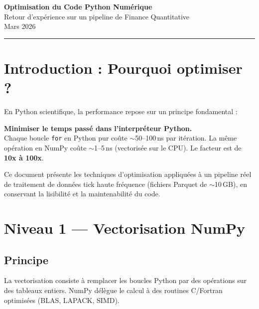 \documentclass[11pt, a4paper]{article}
\begin{document}
\begin{center}
    {\LARGE\bfseries Optimisation du Code Python Num\'erique}\\[0.4cm]
    {\large Retour d'exp\'erience sur un pipeline de Finance Quantitative}\\[0.8cm]
    {\normalsize Mars 2026}\\[0.3cm]
    \rule{\textwidth}{0.4pt}
\end{center}

\tableofcontents
\newpage

\section{Introduction : Pourquoi optimiser ?}

En Python scientifique, la performance repose sur un principe fondamental :

\begin{keybox}[R\`egle d'or]
\textbf{Minimiser le temps pass\'e dans l'interpr\'eteur Python.}\\[0.2cm]
Chaque boucle \texttt{for} en Python pur co\^ute $\sim$50--100\,ns par it\'eration.
La m\^eme op\'eration en NumPy co\^ute $\sim$1--5\,ns (vectoris\'ee sur le CPU).
Le facteur est de \textbf{10x \`a 100x}.
\end{keybox}

Ce document pr\'esente les techniques d'optimisation appliqu\'ees \`a un pipeline r\'eel
de traitement de donn\'ees tick haute fr\'equence (fichiers Parquet de $\sim$10\,GB),
en conservant la lisibilit\'e et la maintenabilit\'e du code.


\section{Niveau 1 --- Vectorisation NumPy}

\subsection{Principe}

La vectorisation consiste \`a remplacer les boucles Python par des op\'erations
sur des tableaux entiers. NumPy d\'el\`egue le calcul \`a des routines C/Fortran
optimis\'ees (BLAS, LAPACK, SIMD).
\end{document}
